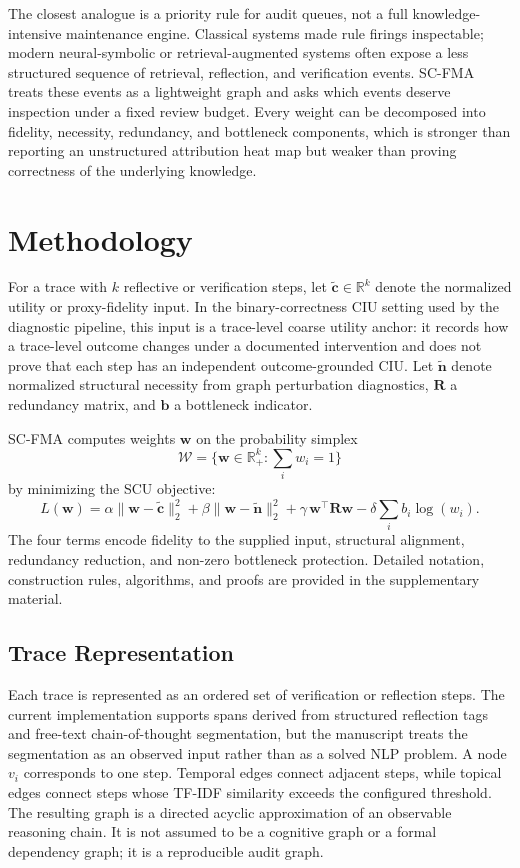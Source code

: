 \documentclass[a4paper,fleqn]{cas-sc}
\begin{document}
The closest analogue is a priority rule for audit queues, not a full knowledge-intensive maintenance engine. Classical systems made rule firings inspectable; modern neural-symbolic or retrieval-augmented systems often expose a less structured sequence of retrieval, reflection, and verification events. SC-FMA treats these events as a lightweight graph and asks which events deserve inspection under a fixed review budget. Every weight can be decomposed into fidelity, necessity, redundancy, and bottleneck components, which is stronger than reporting an unstructured attribution heat map but weaker than proving correctness of the underlying knowledge.

\section{Methodology}

For a trace with $k$ reflective or verification steps, let $\tilde{\mathbf{c}}\in\mathbb{R}^k$ denote the normalized utility or proxy-fidelity input. In the binary-correctness CIU setting used by the diagnostic pipeline, this input is a trace-level coarse utility anchor: it records how a trace-level outcome changes under a documented intervention and does not prove that each step has an independent outcome-grounded CIU. Let $\tilde{\mathbf{n}}$ denote normalized structural necessity from graph perturbation diagnostics, $\mathbf{R}$ a redundancy matrix, and $\mathbf{b}$ a bottleneck indicator.

SC-FMA computes weights $\mathbf{w}$ on the probability simplex
\[
\mathcal{W}=\{\mathbf{w}\in\mathbb{R}_{+}^{k}: \sum_i w_i = 1\}
\]
by minimizing the SCU objective:
\begin{equation}
L(\mathbf{w}) =
\alpha\|\mathbf{w} - \tilde{\mathbf{c}}\|_2^2
+ \beta\|\mathbf{w} - \tilde{\mathbf{n}}\|_2^2
+ \gamma\,\mathbf{w}^{\top}\mathbf{R}\mathbf{w}
- \delta\sum_i b_i \log(w_i).
\label{eq:scu}
\end{equation}
The four terms encode fidelity to the supplied input, structural alignment, redundancy reduction, and non-zero bottleneck protection. Detailed notation, construction rules, algorithms, and proofs are provided in the supplementary material.

\subsection{Trace Representation}

Each trace is represented as an ordered set of verification or reflection steps. The current implementation supports spans derived from structured reflection tags and free-text chain-of-thought segmentation, but the manuscript treats the segmentation as an observed input rather than as a solved NLP problem. A node $v_i$ corresponds to one step. Temporal edges connect adjacent steps, while topical edges connect steps whose TF-IDF similarity exceeds the configured threshold. The resulting graph is a directed acyclic approximation of an observable reasoning chain. It is not assumed to be a cognitive graph or a formal dependency graph; it is a reproducible audit graph.
\end{document}
